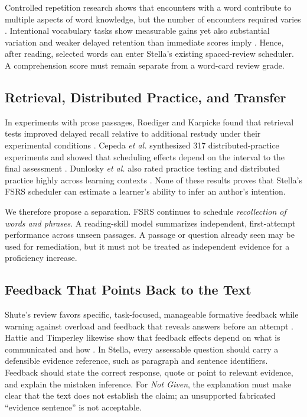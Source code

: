 \documentclass[conference,10pt]{IEEEtran}
\begin{document}
Controlled repetition research shows that encounters with a word contribute to multiple aspects of word knowledge, but the number of encounters required varies \cite{webb2007}. Intentional vocabulary tasks show measurable gains yet also substantial variation and weaker delayed retention than immediate scores imply \cite{webb2020intentional}. Hence, after reading, selected words can enter Stella's existing spaced-review scheduler. A comprehension score must remain separate from a word-card review grade.

\subsection{Retrieval, Distributed Practice, and Transfer}
In experiments with prose passages, Roediger and Karpicke found that retrieval tests improved delayed recall relative to additional restudy under their experimental conditions \cite{roediger2006}. Cepeda \emph{et al.} synthesized 317 distributed-practice experiments and showed that scheduling effects depend on the interval to the final assessment \cite{cepeda2006}. Dunlosky \emph{et al.} also rated practice testing and distributed practice highly across learning contexts \cite{dunlosky2013}. None of these results proves that Stella's FSRS scheduler can estimate a learner's ability to infer an author's intention.

We therefore propose a separation. FSRS continues to schedule \emph{recollection of words and phrases}. A reading-skill model summarizes independent, first-attempt performance across unseen passages. A passage or question already seen may be used for remediation, but it must not be treated as independent evidence for a proficiency increase.

\subsection{Feedback That Points Back to the Text}
Shute's review favors specific, task-focused, manageable formative feedback while warning against overload and feedback that reveals answers before an attempt \cite{shute2008}. Hattie and Timperley likewise show that feedback effects depend on what is communicated and how \cite{hattie2007}. In Stella, every assessable question should carry a defensible evidence reference, such as paragraph and sentence identifiers. Feedback should state the correct response, quote or point to relevant evidence, and explain the mistaken inference. For \emph{Not Given}, the explanation must make clear that the text does not establish the claim; an unsupported fabricated ``evidence sentence'' is not acceptable.
\end{document}

